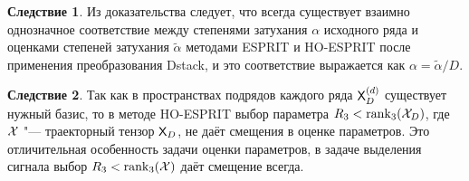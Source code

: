 \documentclass[12pt]{article}
\theoremstyle{plain}
\theoremstyle{definition}
\newtheorem*{corollary}{Следствие}
\theoremstyle{remark}
\begin{document}
\begin{corollary}
  Из доказательства следует, что всегда существует взаимно
  однозначное соответствие между степенями затухания $\alpha$ исходного ряда и
  оценками степеней затухания $\widetilde{\alpha}$ методами ESPRIT и
  HO-ESPRIT после применения преобразования Dstack,
  и это соответствие выражается как $\alpha = \widetilde{\alpha} / D$.
\end{corollary}
\begin{corollary}
  Так как в пространствах подрядов каждого ряда $\mathsf{X}_D^{(d)}$
  существует нужный базис, то в методе HO-ESPRIT выбор параметра $R_3
  < \operatorname{rank}_3(\mathcal{X}_D)$, где $\mathcal{X}$ "--- траекторный
  тензор $\mathsf{X}_D$, не даёт смещения в оценке параметров.
  Это отличительная особенность задачи оценки параметров, в
  задаче выделения сигнала выбор $R_3 < \operatorname{rank}_3(\mathcal{X})$ даёт
  смещение всегда.
\end{corollary}
\end{document}
